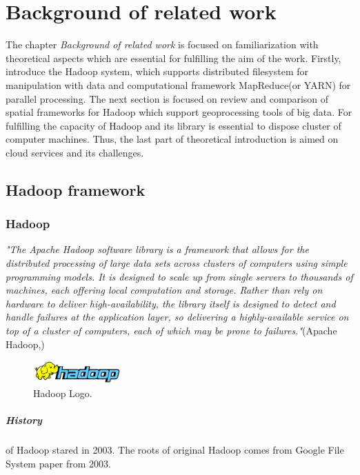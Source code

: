 \documentclass[a4paper,12pt,oneside]{report}
\begin{document}
 



\newpage
\chapter*{Background of related work}
The chapter \textit{Background of related work} is focused on familiarization with theoretical aspects which are essential for fulfilling the aim of the work. Firstly, introduce the Hadoop system, which supports distributed filesystem for manipulation with data and computational framework MapReduce(or YARN) for parallel processing. 
The next section is focused on review and comparison of spatial frameworks for Hadoop which support geoprocessing tools of big data. For fulfilling the capacity of Hadoop and its library is essential to dispose cluster of computer machines. Thus, the last  part of theoretical introduction is aimed on cloud services and its challenges.
\section{Hadoop framework}
\label{sec:hadoop}
		\subsection*{Hadoop}
		\emph{"The Apache Hadoop software library is a framework that allows for the distributed
		  processing of large data sets across clusters of computers using simple programming 
		  models. It is designed to scale up from single servers to 
		 thousands of machines, each offering local computation and storage. Rather than rely 
		 on hardware to deliver high-availability, the library itself is
		  designed to detect and handle failures at the application layer, so delivering a 
		  highly-available service on top of a cluster of computers,
		  each of which may be prone to failures."}(Apache Hadoop,\cite{hadoop_web})
 \begin{figure}[!htbp]
    \centering
    \includegraphics[width=0.3\textwidth]{./img/664px-Hadoop_logo.png}
    \caption[Hadoop architecture2]{\centering Hadoop Logo.}
 \end{figure}
		
		\paragraph*{History} of Hadoop stared in 2003. The roots of original Hadoop comes from Google File System paper from 2003. 
\end{document}
